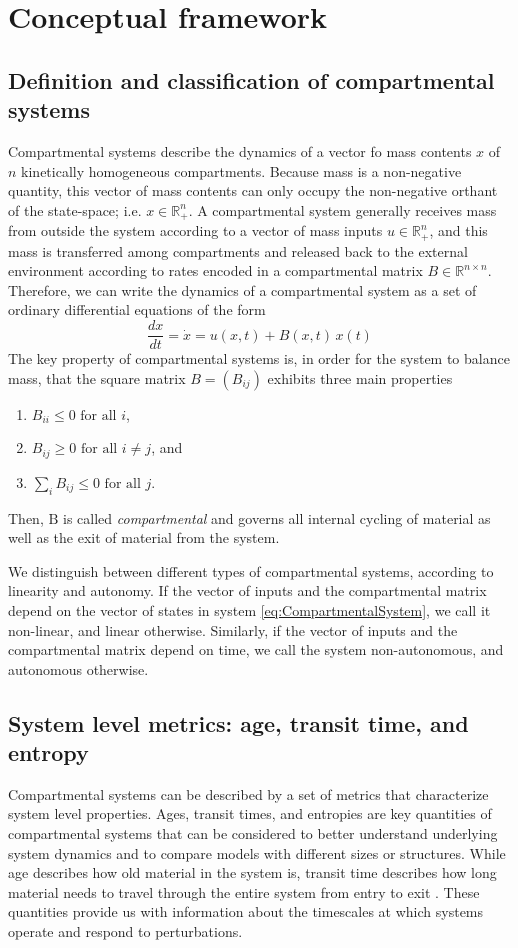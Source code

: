 \documentclass[a4paper]{article}
\newcommand{\tens}[1]{\mathrm{#1}}
\newcommand{\suml}{\sum\limits}
\begin{document}
\section{Conceptual framework}
\subsection{Definition and classification of compartmental systems}
Compartmental systems describe the dynamics of a vector fo mass contents $x$ of $n$ kinetically homogeneous compartments. Because mass is a non-negative quantity, this vector of mass contents can only occupy the non-negative orthant of the state-space; i.e. $x \in \mathbb{R}^n_+$. A compartmental system generally receives mass from outside the system according to a vector of mass inputs $u \in \mathbb{R}^n_+$, and this mass is transferred among compartments and released back to the external environment according to rates encoded in a compartmental matrix $B \in \mathbb{R}^{n \times n}$. Therefore, we can write the dynamics of a compartmental system as a set of ordinary differential equations of the form
\begin{equation} \label{eq:CompartmentalSystem}
\frac{dx}{dt} = \dot{x} = u(x, t) + B(x, t) \, x(t)
\end{equation}
The key property of compartmental systems is, in order for the system to balance mass, that the square matrix $B=(B_{ij})$ exhibits three main properties
\begin{enumerate}
  \item $B_{ii}\leq0\text{ for all }i$,
  \item $B_{ij}\geq0\text{ for all }i\neq j$, and
  \item $\suml_i B_{ij}\leq 0\text{ for all }j$.
\end{enumerate}
Then, $\tens{B}$ is called \emph{compartmental} and governs all internal cycling of material as well as the exit of material from the system.

We distinguish between different types of compartmental systems, according to linearity and autonomy. If the vector of inputs and the compartmental matrix depend on the vector of states in system \eqref{eq:CompartmentalSystem}, we call it non-linear, and linear otherwise. Similarly, if the vector of inputs and the compartmental matrix depend on time, we call the system non-autonomous, and autonomous otherwise. 

\subsection{System level metrics: age, transit time, and entropy}
Compartmental systems can be described by a set of metrics that characterize system level properties. 
Ages, transit times, and entropies are key quantities of compartmental systems that can be considered to better understand underlying system dynamics and to compare models with different sizes or structures.
While age describes how old material in the system is, transit time describes how long material needs to travel through the entire system from entry to exit \citep{bolin1973Tellus, Sierra2017GCB}.
These quantities provide us with information about the timescales at which systems operate and respond to perturbations.
\end{document}
